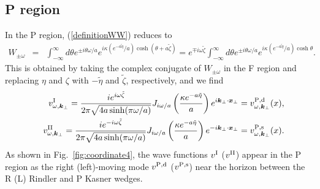 \documentclass[aps,prd,preprintnumbers,nofootinbib,showpacs,11pt]{revtex4}%
\begin{document}
\begin{widetext}
\subsection{P region}
In the P region, 
(\ref{definitionWW}) reduces to 
\begin{eqnarray}
W_{\pm \omega}&=&\int_{-\infty}^{\infty} {d\theta }e^{\pm i\theta\omega/a} e^{i\kappa (e^{-a\tilde\eta}/a)\cosh (\theta+a\tilde\zeta) }
=e^{\mp i\omega\tilde\zeta}\int_{-\infty}^{\infty} {d\theta }e^{\pm i\theta\omega/a} e^{i\kappa (e^{-a\tilde\eta}/a)\cosh \theta }.
\label{definitionWP}
\end{eqnarray}
This is obtained by taking the complex conjugate of $W_{\pm \omega}$ in the F region and replacing 
$\eta$ and $\zeta$ with $-\tilde\eta$ and $\tilde\zeta$, respectively, and we find
\begin{eqnarray}
&&v^{{\rm I}}_{\omega,\bm k_\perp}=
{ie^{i\omega\tilde\zeta}\over 2\pi\sqrt{4a\sinh (\pi \omega/a)}}
J_{i\omega/a}\left({\kappa e^{-a\tilde\eta}\over a}\right)
e^{i\bm k_\perp\cdot \bm x_\perp}=v_{\omega,{\bm k}_\perp}^{{\rm P},{\rm d}}(x),
\\
&&v^{{\rm II}}_{\omega,\bm k_\perp}=
{ie^{-i\omega\tilde\zeta}\over 2\pi\sqrt{4a\sinh (\pi \omega/a)}}
J_{i\omega/a}\left({\kappa e^{-a\tilde\eta}\over a}\right)
e^{-i\bm k_\perp\cdot \bm x_\perp}
=v_{\omega,{\bm k}_\perp}^{{\rm P},{\rm s}}(x).
\end{eqnarray}
As shown in Fig.~\ref{fig:coordinate4},
the wave functions $v^{\rm I}$ ($v^{\rm II}$) 
appear in the P region as the right (left)-moving mode $v^{\rm P, d}$ ($v^{\rm P, s}$) 
near the horizon between the R (L) Rindler and P Kasner wedges.






\end{widetext}
\end{document}
